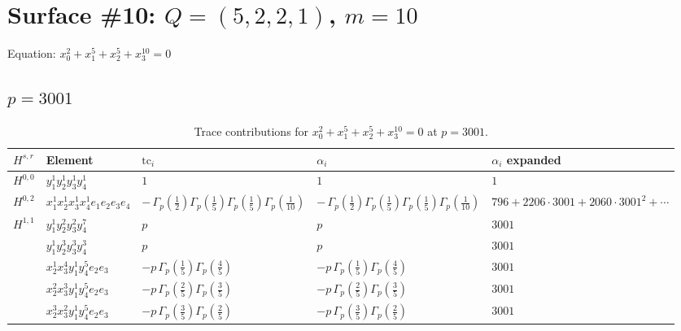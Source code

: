 \documentclass[11pt]{article}
\begin{document}
\newpage

\section*{Surface \#10: $Q=(5, 2, 2, 1)$, $m=10$}

Equation: $x_0^{2} + x_1^{5} + x_2^{5} + x_3^{10} = 0$

\subsection*{$p = 3001$}

\begin{table}[ht]
\centering
\caption{Trace contributions for $x_0^{2} + x_1^{5} + x_2^{5} + x_3^{10} = 0$ at $p=3001$.}\label{tab:diagonal-10}
\renewcommand{\arraystretch}{1.1}
{\scriptsize
\begin{tabular}{@{}lllll@{}}
\toprule
$H^{s,r}$ & Element & $\mathrm{tc}_i$ & $\alpha_i$ & $\alpha_i$ expanded \\
\midrule
$H^{0,0}$ & $y_{1}^{1} y_{2}^{1} y_{3}^{1} y_{4}^{1}$ & $1$ & $1$ & $1$ \\
\midrule
$H^{0,2}$ & $x_{1}^{1} x_{2}^{1} x_{3}^{1} x_{4}^{1}  e_{1} e_{2} e_{3} e_{4}$ & $- \, \Gamma_p \left( \frac{1}{2} \right) \Gamma_p \left( \frac{1}{5} \right) \Gamma_p \left( \frac{1}{5} \right) \Gamma_p \left( \frac{1}{10} \right)$ & $- \, \Gamma_p \left( \frac{1}{2} \right) \Gamma_p \left( \frac{1}{5} \right) \Gamma_p \left( \frac{1}{5} \right) \Gamma_p \left( \frac{1}{10} \right)$ & $796{+}2206{\cdot}3001{+}2060{\cdot}3001^{2}{+}\cdots$ \\
\midrule
$H^{1,1}$ & $y_{1}^{1} y_{2}^{2} y_{3}^{2} y_{4}^{7}$ & $p \,$ & $p \,$ & $3001$ \\
 & $y_{1}^{1} y_{2}^{3} y_{3}^{3} y_{4}^{3}$ & $p \,$ & $p \,$ & $3001$ \\
 & $x_{2}^{1} x_{3}^{4} y_{1}^{1} y_{4}^{5} e_{2} e_{3}$ & $- p \, \Gamma_p \left( \frac{1}{5} \right) \Gamma_p \left( \frac{4}{5} \right)$ & $- p \, \Gamma_p \left( \frac{1}{5} \right) \Gamma_p \left( \frac{4}{5} \right)$ & $3001$ \\
 & $x_{2}^{2} x_{3}^{3} y_{1}^{1} y_{4}^{5} e_{2} e_{3}$ & $- p \, \Gamma_p \left( \frac{2}{5} \right) \Gamma_p \left( \frac{3}{5} \right)$ & $- p \, \Gamma_p \left( \frac{2}{5} \right) \Gamma_p \left( \frac{3}{5} \right)$ & $3001$ \\
 & $x_{2}^{3} x_{3}^{2} y_{1}^{1} y_{4}^{5} e_{2} e_{3}$ & $- p \, \Gamma_p \left( \frac{3}{5} \right) \Gamma_p \left( \frac{2}{5} \right)$ & $- p \, \Gamma_p \left( \frac{3}{5} \right) \Gamma_p \left( \frac{2}{5} \right)$ & $3001$ \\

\end{tabular}}
\end{table}
\end{document}
